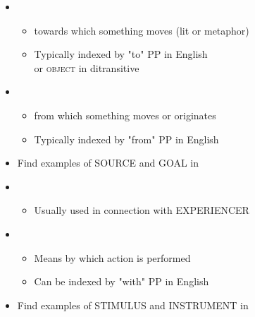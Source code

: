 \documentclass[a4paper,landscape,headrule,footrule,xetex]{foils}
\begin{document}
\begin{itemize}
\item  {}
  \begin{itemize}
  \item  towards which something moves (lit or metaphor)
 \item  Typically indexed by "to" PP in English 
   \\ or \textsc{object} in ditransitive
  \end{itemize}
  \begin{exe}
  \ex{}
  \ex{}
  \end{exe}
\item  {}
 \begin{itemize}
 \item  from which something moves or originates
 \item  Typically indexed by "from" PP in English
 \end{itemize}
  \begin{exe}
 \ex{}  
\end{exe}
\item Find  examples of SOURCE and GOAL in \Story{}\task
\newpage
\item  {}
  \begin{itemize}
  \item  Usually used in connection with EXPERIENCER
  \end{itemize}
  \begin{exe}
  \ex{}
  \ex{}
\end{exe}
\item  {}
  \begin{itemize}
  \item  Means by which action is performed
  \item  Can be indexed by "with" PP in English
  \end{itemize}
  \begin{exe}
    \ex{}
  \end{exe}
\item Find  examples of STIMULUS and INSTRUMENT in \Story{}\task
\end{itemize}


\end{document}
